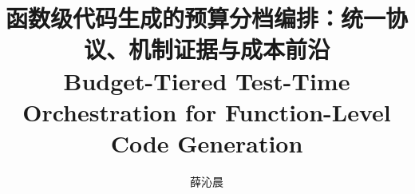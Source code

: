 \documentclass[lang=cn,newtx,a4paper,bibtex]{elegantpaper}
\title{%
  函数级代码生成的预算分档编排：统一协议、机制证据与成本前沿\\[4pt]
  \large Budget-Tiered Test-Time Orchestration for Function-Level Code Generation%
}
\author{薛沁晨}
\date{}
\begin{document}
\maketitle



\twocolumn









\appendix



\end{document}
